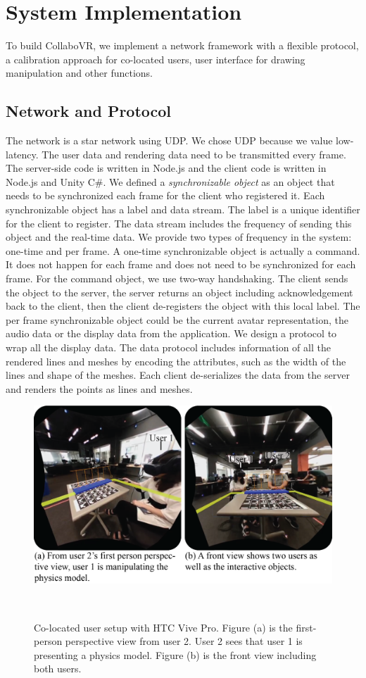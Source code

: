 \documentclass{sigchi}
\begin{document}
\section{System Implementation}
To build CollaboVR, we implement a network framework with a flexible protocol, a calibration approach for co-located users, user interface for drawing manipulation and other functions.

\subsection{Network and Protocol}
The network is a star network using UDP. We chose UDP because we value low-latency. The user data and rendering data need to be transmitted every frame. The server-side code is written in Node.js and the client code is written in Node.js and Unity C\#. We defined a \textit{synchronizable object} as an object that needs to be synchronized each frame for the client who registered it. Each synchronizable object has a label and data stream. The label is a unique identifier for the client to register. The data stream includes the frequency of sending this object and the real-time data. We provide two types of frequency in the system: one-time and per frame. A one-time synchronizable object is actually a command. It does not happen for each frame and does not need to be synchronized for each frame. For the command object, we use two-way handshaking. The client sends the object to the server, the server returns an object including acknowledgement back to the client, then the client de-registers the object with this local label. The per frame synchronizable object could be the current avatar representation, the audio data or the display data from the application. We design a protocol to wrap all the display data. The data protocol includes information of all the rendered lines and meshes by encoding the attributes, such as the width of the lines and shape of the meshes. Each client de-serializes the data from the server and renders the points as lines and meshes.


\begin{figure}[tb!]
 \centering
 \includegraphics[width=0.95\columnwidth]{Figure5.png}
 \caption{Co-located user setup with HTC Vive Pro. Figure (a) is the first-person perspective view from user 2. User 2 sees that user 1 is presenting a physics model. Figure (b) is the front view including both users.
 }~\label{fig:vivepro}
\end{figure}
\end{document}
